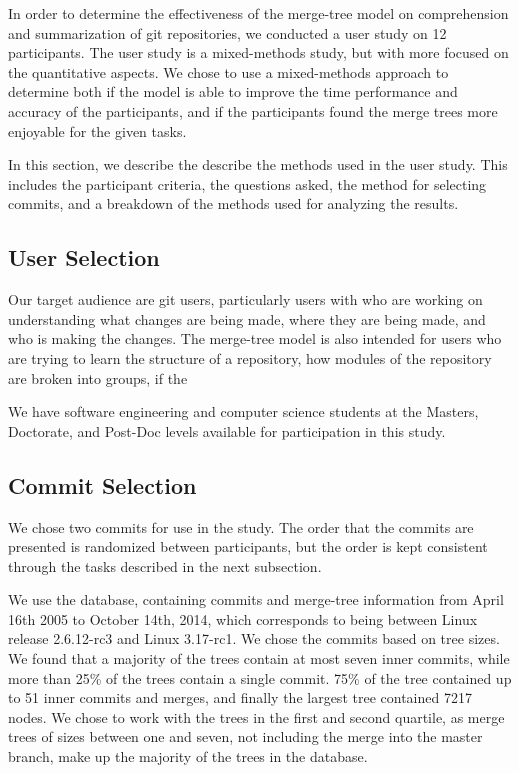 
In order to determine the effectiveness of the merge-tree model on
comprehension and summarization of git repositories, we conducted a user
study on 12 participants. The user study is a
mixed-methods study, but with more focused on the quantitative aspects.
We chose to use a mixed-methods approach to determine both if the model
is able to improve the time performance and accuracy of the
participants, and if the participants found the merge trees more
enjoyable for the given tasks.

In this section, we describe the describe the methods used in the user
study. This includes the participant criteria, the questions asked, the
method for selecting commits, and a breakdown of the methods used for
analyzing the results.

\subsection{User Selection}
\label{sub:user_selection}

Our target audience are git users, particularly users with who are
working on understanding what changes are being made, where they are
being made, and who is making the changes. The merge-tree model is also
intended for users who are trying to learn the structure of a
repository, how modules of the repository are broken into groups, if the

We have software engineering and computer science students at the
Masters, Doctorate, and Post-Doc levels available for participation in
this study. 


\subsection{Commit Selection}
\label{sub:commit_selection}

We chose two commits for use in the study. The order that the commits
are presented is randomized between participants, but the order is kept
consistent through the tasks described in the next subsection.

We use the \tool database, containing commits and merge-tree information
from April 16th 2005 to October 14th, 2014, which corresponds to being
between Linux release 2.6.12-rc3 and Linux 3.17-rc1.  We chose the commits based on tree sizes. We
found that a majority of the trees contain at most seven inner commits,
while more than 25\% of the trees contain a single commit. 75\% of the
tree contained up to 51 inner commits and merges, and finally the
largest tree contained 7217 nodes. We chose to work with the trees in
the first and second quartile, as merge trees of sizes between one and
seven, not including the merge into the master branch, make up the
majority of the trees in the database.

